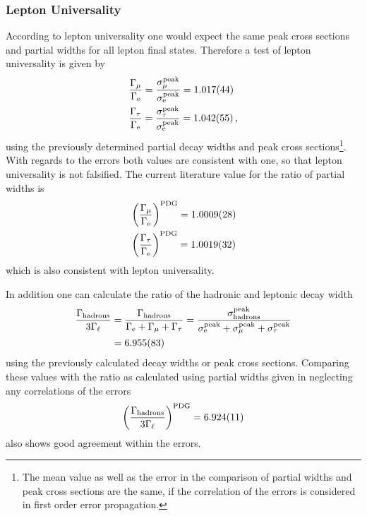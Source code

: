 \documentclass[11pt, a4paper]{article}
\numberwithin{equation}{section}
\begin{document}
\subsubsection{Lepton Universality}
According to lepton universality one would expect the same peak cross sections and partial widths for all lepton final states.
Therefore a test of lepton universality is given by
\begin{align*}
	&\frac{\Gamma_\mathrm{\mu}}{\Gamma_\mathrm{e}} = \frac{\sigma_\mathrm{\mu}^\mathrm{peak}}{\sigma_\mathrm{e}^\mathrm{peak}} = \num{1.017 +- 0.044}\\
	&\frac{\Gamma_\mathrm{\tau}}{\Gamma_\mathrm{e}} = \frac{\sigma_\mathrm{\tau}^\mathrm{peak}}{\sigma_\mathrm{e}^\mathrm{peak}} = \num{1.042 +- 0.055} \,\text{,}
\end{align*}
using the previously determined partial decay widths and peak cross sections\footnote{The mean value as well as the error in the comparison of partial widths and peak cross sections are the same, if the correlation of the errors is considered in first order error propagation.}.
With regards to the errors both values are consistent with one, so that lepton universality is not falsified.
The current literature value for the ratio of partial widths is \cite{pdg}
\begin{align*}
	&\left(\frac{\Gamma_\mathrm{\mu}}{\Gamma_\mathrm{e}}\right)^\mathrm{PDG} = \num{1.0009 +- 0.0028} \\
	&\left(\frac{\Gamma_\mathrm{\tau}}{\Gamma_\mathrm{e}}\right)^\mathrm{PDG} = \num{1.0019 +- 0.0032} \\
\end{align*}
which is also consistent with lepton universality.

In addition one can calculate the ratio of the hadronic and leptonic decay width
\begin{align*}
	\frac{\Gamma_\mathrm{hadrons}}{3\Gamma_\ell} &= \frac{\Gamma_\mathrm{hadrons}}{\Gamma_\mathrm{e} + \Gamma_\mathrm{\mu} + \Gamma_\mathrm{\tau}} = \frac{\sigma_\mathrm{hadrons}^\mathrm{peak}}{\sigma_\mathrm{e}^\mathrm{peak} + \sigma_\mathrm{\mu}^\mathrm{peak} + \sigma_\mathrm{\tau}^\mathrm{peak}} \\
	&= \num{6.955 +- 0.083}
\end{align*}
using the previously calculated decay widths or peak cross sections.
Comparing these values with the ratio as calculated using partial widths given in \cite{pdg} neglecting any correlations of the errors
\begin{align*}
	\left(\frac{\Gamma_\mathrm{hadrons}}{3\Gamma_\ell}\right)^\mathrm{PDG} = \num{6.924 +- 0.011}
\end{align*}
also shows good agreement within the errors.
\end{document}
